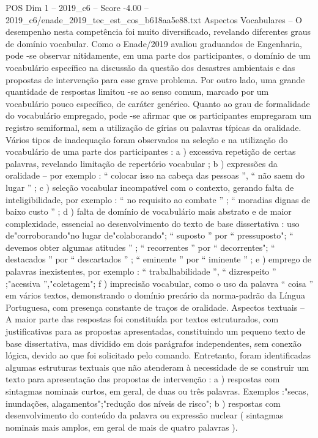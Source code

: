 \begin{textsample}{POS Dim 1 – 2019\_c6 – Score -4.00 – 2019\_c6/enade\_2019\_tec\_est\_cos\_b618aa5e88.txt}
Aspectos Vocabulares – O desempenho nesta competência foi muito diversificado, revelando diferentes graus de domínio vocabular.
Como o Enade/2019 avaliou graduandos de Engenharia, pode -se observar nitidamente, em uma parte dos participantes, o domínio de um vocabulário específico na discussão da questão dos desastres ambientais e das propostas de intervenção para esse grave problema.
Por outro lado, uma grande quantidade de respostas limitou -se ao senso comum, marcado por um vocabulário pouco específico, de caráter genérico.
Quanto ao grau de formalidade do vocabulário empregado, pode -se afirmar que os participantes empregaram um registro semiformal, sem a utilização de gírias ou palavras típicas da oralidade.
Vários tipos de inadequação foram observados na seleção e na utilização do vocabulário de uma parte dos participantes : a ) excessiva repetição de certas palavras, revelando limitação de repertório vocabular ; b ) expressões da oralidade – por exemplo : “ colocar isso na cabeça das pessoas ”, “ não saem do lugar ” ; c ) seleção vocabular incompatível com o contexto, gerando falta de inteligibilidade, por exemplo : “ no requisito ao combate ” ; “ moradias dignas de baixo custo ” ; d ) falta de domínio de vocabulário mais abstrato e de maior complexidade, essencial ao desenvolvimento do texto de base dissertativa : uso de"corroborando"no lugar de"colaborando"; “ suposto ” por “ pressuposto"; “ devemos obter algumas atitudes ” ; “ recorrentes ” por “ decorrentes"; “ destacados ” por “ descartados ” ; “ eminente ” por “ iminente ” ; e ) emprego de palavras inexistentes, por exemplo : “ trabalhabilidade ”, “ dizrespeito ” ;"acessiva ”,"coletagem"; f ) imprecisão vocabular, como o uso da palavra “ coisa ” em vários textos, demonstrando o domínio precário da norma-padrão da Língua Portuguesa, com presença constante de traços de oralidade.
Aspectos textuais – A maior parte das respostas foi constituída por textos estruturados, com justificativas para as propostas apresentadas, constituindo um pequeno texto de base dissertativa, mas dividido em dois parágrafos independentes, sem conexão lógica, devido ao que foi solicitado pelo comando.
Entretanto, foram identificadas algumas estruturas textuais que não atenderam à necessidade de se construir um texto para apresentação das propostas de intervenção : a ) respostas com sintagmas nominais curtos, em geral, de duas ou três palavras.
Exemplos :"secas, inundações, alagamentos";"redução dos níveis de risco"; b ) respostas com desenvolvimento do conteúdo da palavra ou expressão nuclear ( sintagmas nominais mais amplos, em geral de mais de quatro palavras ).

\end{textsample}
